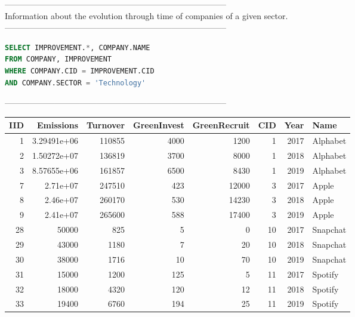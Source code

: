 --------------------------------------------------------------------------------
\\Information about the evolution through time of companies of a given sector.\\
--------------------------------------------------------------------------------
\begin{lstlisting}[language = SQL]
SELECT IMPROVEMENT.*, COMPANY.NAME
FROM COMPANY, IMPROVEMENT 
WHERE COMPANY.CID = IMPROVEMENT.CID
AND COMPANY.SECTOR = 'Technology'
\end{lstlisting}
--------------------------------------------------------------------------------\\\begin{tabular}{rrrrrrrl}
\toprule
   IID &       Emissions &   Turnover &   GreenInvest &   GreenRecruit &   CID &   Year & Name     \\
\midrule
     1 &     3.29491e+06 &     110855 &          4000 &           1200 &     1 &   2017 & Alphabet \\
     2 &     1.50272e+07 &     136819 &          3700 &           8000 &     1 &   2018 & Alphabet \\
     3 &     8.57655e+06 &     161857 &          6500 &           8430 &     1 &   2019 & Alphabet \\
     7 &     2.71e+07    &     247510 &           423 &          12000 &     3 &   2017 & Apple    \\
     8 &     2.46e+07    &     260170 &           530 &          14230 &     3 &   2018 & Apple    \\
     9 &     2.41e+07    &     265600 &           588 &          17400 &     3 &   2019 & Apple    \\
    28 & 50000           &        825 &             5 &              0 &    10 &   2017 & Snapchat \\
    29 & 43000           &       1180 &             7 &             20 &    10 &   2018 & Snapchat \\
    30 & 38000           &       1716 &            10 &             70 &    10 &   2019 & Snapchat \\
    31 & 15000           &       1200 &           125 &              5 &    11 &   2017 & Spotify  \\
    32 & 18000           &       4320 &           120 &             12 &    11 &   2018 & Spotify  \\
    33 & 19400           &       6760 &           194 &             25 &    11 &   2019 & Spotify  \\
\bottomrule
\end{tabular}